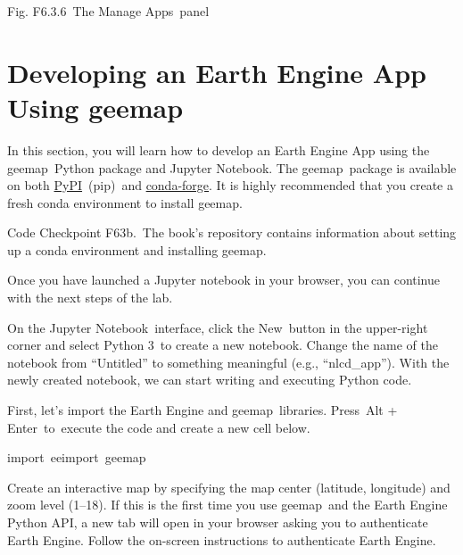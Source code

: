 \documentclass[
  letterpaper,
  DIV=11,
  numbers=noendperiod]{scrreprt}
\begin{document}
Fig. F6.3.6~The Manage Apps~panel

\hypertarget{developing-an-earth-engine-app-using-geemap}{%
\section{Developing an Earth Engine App Using
geemap}\label{developing-an-earth-engine-app-using-geemap}}

In this section, you will learn how to develop an Earth Engine App using
the geemap~Python package and Jupyter Notebook. The geemap~package is
available on both
\href{https://www.google.com/url?q=https://pypi.org/project/leafmap\&sa=D\&source=editors\&ust=1671458841303040\&usg=AOvVaw25Lg4yxDI4b31VJovOcUOc}{PyPI}~(pip)~and
\href{https://www.google.com/url?q=https://anaconda.org/conda-forge/leafmap\&sa=D\&source=editors\&ust=1671458841303462\&usg=AOvVaw267tbdQ3NyyHL53Jmk4W4k}{conda-forge}.
It is highly recommended that you create a fresh conda environment to
install geemap.

\begin{tcolorbox}[enhanced jigsaw, left=2mm, breakable, rightrule=.15mm, opacityback=0, colframe=quarto-callout-note-color-frame, colbacktitle=quarto-callout-note-color!10!white, arc=.35mm, opacitybacktitle=0.6, toptitle=1mm, colback=white, leftrule=.75mm, title=\textcolor{quarto-callout-note-color}{\faInfo}\hspace{0.5em}{Note}, toprule=.15mm, bottomtitle=1mm, titlerule=0mm, bottomrule=.15mm, coltitle=black]

Code Checkpoint F63b.~The book's repository contains information about
setting up a conda environment and installing geemap.

\end{tcolorbox}

Once you have launched a Jupyter notebook in your browser, you can
continue with the next steps of the lab.

On the Jupyter Notebook~interface, click the New~button in the
upper-right corner and select Python 3~to create a new notebook. Change
the name of the notebook from ``Untitled'' to something meaningful
(e.g., ``nlcd\_app''). With the newly created notebook, we can start
writing and executing Python code.

First, let's import the Earth Engine and geemap~libraries. Press~Alt +
Enter~to~execute the code and create a new cell below.

import~eeimport~geemap

Create an interactive map by specifying the map center (latitude,
longitude) and zoom level (1--18). If this is the first time you use
geemap~and the Earth Engine Python API, a new tab will open in your
browser asking you to authenticate Earth Engine. Follow the on-screen
instructions to authenticate Earth Engine.
\end{document}

